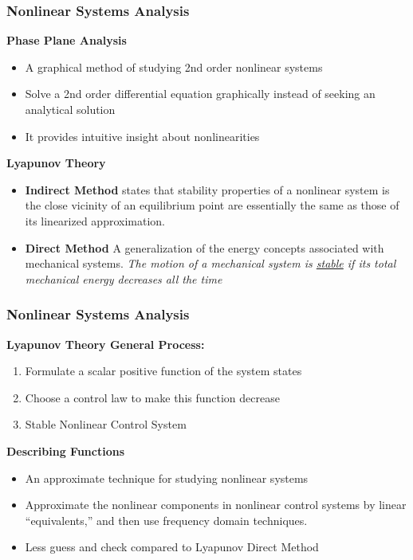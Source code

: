 \documentclass[show notes]{beamer}       %
\begin{document}
\begin{frame}
\frametitle{Nonlinear Systems Analysis}
\textbf{Phase Plane Analysis}\\
\begin{itemize}
\item A graphical method of studying 2nd order nonlinear systems
\item Solve a 2nd order differential equation graphically instead of seeking an analytical solution
\item It provides intuitive insight about nonlinearities
\end{itemize}
\textbf{Lyapunov Theory}\\
\begin{itemize}
\item \textbf{Indirect Method} states that stability properties of a nonlinear system is the close vicinity of an equilibrium point are essentially the same as those of its linearized approximation.
\item \textbf{Direct Method} A generalization of the energy concepts associated with mechanical systems. \textit{The motion of a mechanical system is \underline{stable} if its total mechanical energy decreases all the time}
\end{itemize}
\end{frame}

\begin{frame}
\frametitle{Nonlinear Systems Analysis}
\textbf{Lyapunov Theory General Process:}
\begin{enumerate}
\item Formulate a scalar positive function of the system states
\item Choose a control law to make this function decrease
\item Stable Nonlinear Control System
\end{enumerate}
\textbf{Describing Functions}
\begin{itemize}
\item An approximate technique for studying nonlinear systems
\item Approximate the nonlinear components in nonlinear control systems by linear ``equivalents,'' and then use frequency domain techniques.
\item Less guess and check compared to Lyapunov Direct Method
\end{itemize}
\end{frame}
\end{document}
